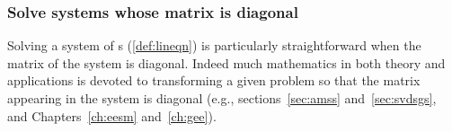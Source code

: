 \subsubsection{Solve systems whose matrix is diagonal}

Solving a system of s (\autoref{def:lineqn}) is particularly straightforward when the matrix of the system is diagonal.
Indeed much mathematics in both theory and applications is devoted to transforming a given problem so that the matrix appearing in the  system is diagonal (e.g., sections~\ref{sec:amss} and~\ref{sec:svdsgs}, and Chapters~\ref{ch:eesm} and~\ref{ch:gee}).

\begin{comment}
Here prepare for using the \svd, but also use diagonal matrices to reinforce the translation to/from matrix and symbolic forms, and to reinforce zero, one, many solutions.
\end{comment}%



